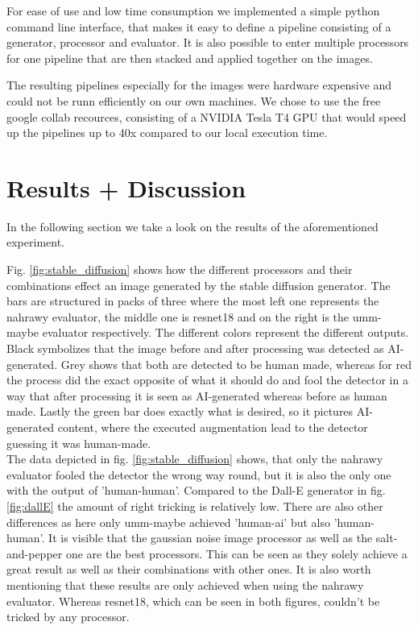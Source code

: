 \documentclass{article} %
\begin{document}
For ease of use and low time consumption we implemented a simple python command line interface, that makes it easy to define a pipeline consisting of a generator, processor and evaluator. It is also possible to enter multiple processors for one pipeline that are then stacked and applied together on the images.

The resulting pipelines especially for the images were hardware expensive and could not be runn efficiently on our own machines. We chose to use the free google collab recources, consisting of a NVIDIA Tesla T4 GPU that would speed up the pipelines up to 40x compared to our local execution time. 

\section{Results + Discussion}
In the following section we take a look on the results of the aforementioned experiment.


Fig. \ref{fig:stable_diffusion} shows how the different processors and their combinations effect an image generated by the stable diffusion generator. The bars are structured in packs of three where the most left one represents the nahrawy evaluator, the middle one is resnet18 and on the right is the umm-maybe evaluator respectively. The different colors represent the different outputs. Black symbolizes that the image before and after processing was detected as AI-generated. Grey shows that both are detected to be human made, whereas for red the process did the exact opposite of what it should do and fool the detector in a way that after processing it is seen as AI-generated whereas before as human made. Lastly the green bar does exactly what is desired, so it pictures AI-generated content, where the executed augmentation lead to the detector guessing it was human-made. \\
The data depicted in fig. \ref{fig:stable_diffusion} shows, that only the nahrawy evaluator fooled the detector the wrong way round, but it is also the only one with the output of 'human-human'. Compared to the Dall-E generator in fig. \ref{fig:dallE} the amount of right tricking is relatively low. There are also other differences as here only umm-maybe achieved 'human-ai' but also 'human-human'.
It is visible that the gaussian noise image processor as well as the salt-and-pepper one are the best processors. This can be seen as they solely achieve a great result as well as their combinations with other ones. It is also worth mentioning that these results are only achieved when using the nahrawy evaluator. Whereas resnet18, which can be seen in both figures, couldn't be tricked by any processor.
\end{document}
